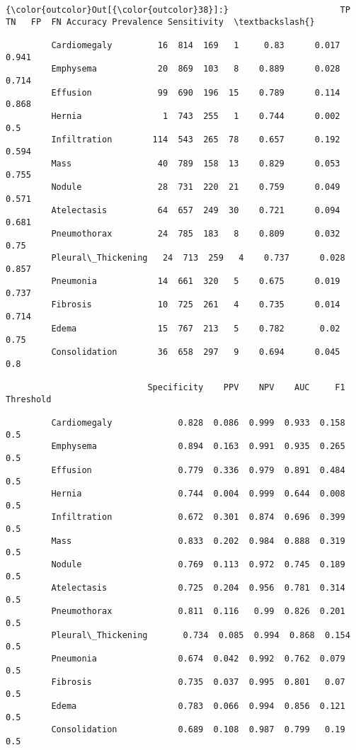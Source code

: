\documentclass[11pt]{article}
\begin{document}
\begin{Verbatim}[commandchars=\\\{\}]
{\color{outcolor}Out[{\color{outcolor}38}]:}                      TP   TN   FP  FN Accuracy Prevalence Sensitivity  \textbackslash{}
                                                                                 
         Cardiomegaly         16  814  169   1     0.83      0.017       0.941   
         Emphysema            20  869  103   8    0.889      0.028       0.714   
         Effusion             99  690  196  15    0.789      0.114       0.868   
         Hernia                1  743  255   1    0.744      0.002         0.5   
         Infiltration        114  543  265  78    0.657      0.192       0.594   
         Mass                 40  789  158  13    0.829      0.053       0.755   
         Nodule               28  731  220  21    0.759      0.049       0.571   
         Atelectasis          64  657  249  30    0.721      0.094       0.681   
         Pneumothorax         24  785  183   8    0.809      0.032        0.75   
         Pleural\_Thickening   24  713  259   4    0.737      0.028       0.857   
         Pneumonia            14  661  320   5    0.675      0.019       0.737   
         Fibrosis             10  725  261   4    0.735      0.014       0.714   
         Edema                15  767  213   5    0.782       0.02        0.75   
         Consolidation        36  658  297   9    0.694      0.045         0.8   
         
                            Specificity    PPV    NPV    AUC     F1 Threshold  
                                                                               
         Cardiomegaly             0.828  0.086  0.999  0.933  0.158       0.5  
         Emphysema                0.894  0.163  0.991  0.935  0.265       0.5  
         Effusion                 0.779  0.336  0.979  0.891  0.484       0.5  
         Hernia                   0.744  0.004  0.999  0.644  0.008       0.5  
         Infiltration             0.672  0.301  0.874  0.696  0.399       0.5  
         Mass                     0.833  0.202  0.984  0.888  0.319       0.5  
         Nodule                   0.769  0.113  0.972  0.745  0.189       0.5  
         Atelectasis              0.725  0.204  0.956  0.781  0.314       0.5  
         Pneumothorax             0.811  0.116   0.99  0.826  0.201       0.5  
         Pleural\_Thickening       0.734  0.085  0.994  0.868  0.154       0.5  
         Pneumonia                0.674  0.042  0.992  0.762  0.079       0.5  
         Fibrosis                 0.735  0.037  0.995  0.801   0.07       0.5  
         Edema                    0.783  0.066  0.994  0.856  0.121       0.5  
         Consolidation            0.689  0.108  0.987  0.799   0.19       0.5  
\end{Verbatim}
            
\end{document}
